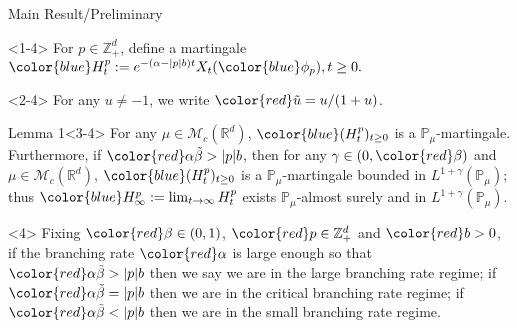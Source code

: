 \documentclass[xcolor=dvipsnames]{beamer}
\begin{document}
\begin{frame} {Main Result/Preliminary}
	\begin{block}{}<1-4>
		For $p\in \mathbb{Z}_+^d$, define a martingale
		$
		\color{blue}H_t^p
		:= e^{-(\alpha-|p|b)t}X_t({\color{blue}\phi_p}), t\geq 0.
		$
	\end{block}
	
	\begin{block}{}<2-4>
		For any $u \neq -1$, we write $\color{red}\tilde u = u/(1+ u)$.
	\end{block}
	
	\begin{block}{Lemma 1}<3-4>
		For any $\mu\in \mathcal M_c(\mathbb R^d)$, $\color{blue}(H_t^p)_{t\geq 0}$ is a $\mathbb{P}_{\mu}$-martingale.
		Furthermore, if $\color{red}\alpha  \tilde \beta>|p|b$, then for any $\gamma\in (0, {\color{red}\beta})$ and $\mu\in \mathcal M_c(\mathbb R^d)$,  $\color{blue}(H_t^p)_{t\geq 0}$ is a $\mathbb{P}_{\mu}$-martingale bounded in $L^{1+\gamma}(\mathbb{P}_{\mu})$;
		thus $\color{blue}H^p_{\infty}:=\lim_{t\rightarrow \infty}H_t^p$ exists $\mathbb{P}_{\mu}$-almost surely and in $L^{1+\gamma}(\mathbb P_\mu)$.
	\end{block}
	\begin{block}{}<4>
		Fixing $\color{red}\beta\in (0,1)$, $\color{red}p\in \mathbb Z_+^d$ and $\color{red}b>0$, if the branching rate $\color{red} \alpha$ is large enough so that $\color{red}\alpha  \tilde \beta>|p|b$ then we say we are in the large branching rate regime; if $\color{red}\alpha \tilde \beta= |p|b$ then we are in the critical branching rate regime;
		if $\color{red}\alpha \tilde \beta< |p|b$ then we are in the small branching rate regime.
	\end{block}
\end{frame}
\end{document}
